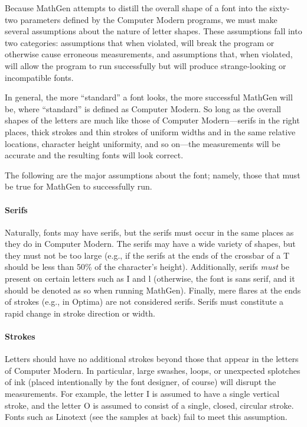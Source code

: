 
Because MathGen attempts to distill the overall shape of a font into the
sixty-two parameters defined by the Computer Modern programs, we must make
several assumptions about the nature of letter shapes. These assumptions fall
into two categories: assumptions that when violated, will break the program or
otherwise cause erroneous measurements, and assumptions that, when violated,
will allow the program to run successfully but will produce strange-looking or
incompatible fonts.

In general, the more ``standard'' a font looks, the more successful MathGen will
be, where ``standard'' is defined as Computer Modern. So long as the overall
shapes of the letters are much like those of Computer Modern---serifs in the
right places, thick strokes and thin strokes of uniform widths and in the same
relative locations, character height uniformity, and so on---the measurements
will be accurate and the resulting fonts will look correct.

The following are the major assumptions about the font; namely, those that must
be true for MathGen to successfully run.

\paragraph{Serifs} Naturally, fonts may have serifs, but the serifs must occur
in the same places as they do in Computer Modern. The serifs may have a wide
variety of shapes, but they must not be too large (e.g., if the serifs at the
ends of the crossbar of a T should be less than 50\% of the character's height).
Additionally, serifs \emph{must} be present on certain letters such as I and l
(otherwise, the font is sans serif, and it should be denoted as so when running
MathGen). Finally, mere flares at the ends of strokes (e.g., in Optima) are not
considered serifs. Serifs must constitute a rapid change in stroke direction or
width.

\paragraph{Strokes} Letters should have no additional strokes beyond those that
appear in the letters of Computer Modern. In particular, large swashes, loops,
or unexpected splotches of ink (placed intentionally by the font designer, of
course) will disrupt the measurements. For example, the letter I is assumed to
have a single vertical stroke, and the letter O is assumed to consist of a
single, closed, circular stroke. Fonts such as Linotext (see the samples at
back) fail to meet this assumption.

